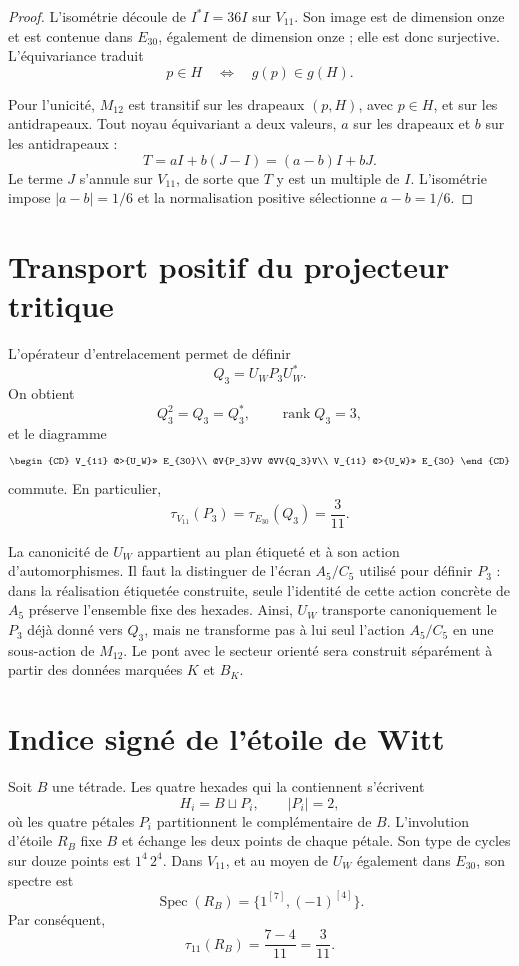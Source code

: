 \begin{proof}
L'isométrie découle de \(I^*I=36I\) sur \(V_{11}\). Son image est de
dimension onze et est contenue dans \(E_{30}\), également de dimension onze ;
elle est donc surjective. L'équivariance traduit
\[
 p\in H\quad\Longleftrightarrow\quad g(p)\in g(H).
\]

Pour l'unicité, \(M_{12}\) est transitif sur les drapeaux
\((p,H)\), avec \(p\in H\), et sur les antidrapeaux. Tout noyau
équivariant a deux valeurs, \(a\) sur les drapeaux et \(b\) sur les
antidrapeaux :
\[
 T=aI+b(J-I)=(a-b)I+bJ.
\]
Le terme \(J\) s'annule sur \(V_{11}\), de sorte que \(T\) y est un
multiple de \(I\). L'isométrie impose \(|a-b|=1/6\) et la normalisation
positive sélectionne \(a-b=1/6\).
\end{proof}

\section{Transport positif du projecteur tritique}

L'opérateur d'entrelacement permet de définir
\[
 \boxed{Q_3=U_WP_3U_W^*.}
\]
On obtient
\[
 Q_3^2=Q_3=Q_3^*,
 \qquad
 \operatorname{rank}Q_3=3,
\]
et le diagramme
\[
\begin{CD}
V_{11} @>{U_W}>> E_{30}\\
@V{P_3}VV @VV{Q_3}V\\
V_{11} @>{U_W}>> E_{30}
\end{CD}
\]
commute. En particulier,
\[
 \boxed{\tau_{V_{11}}(P_3)=\tau_{E_{30}}(Q_3)=\frac3{11}.}
\]

La canonicité de \(U_W\) appartient au plan étiqueté et à son action
d'automorphismes. Il faut la distinguer de l'écran \(A_5/C_5\) utilisé pour
définir \(P_3\) : dans la réalisation étiquetée construite, seule l'identité
de cette action concrète de \(A_5\) préserve l'ensemble fixe des hexades. Ainsi,
\(U_W\) transporte canoniquement le \(P_3\) déjà donné vers
\(Q_3\), mais ne transforme pas à lui seul l'action \(A_5/C_5\) en une
sous-action de \(M_{12}\). Le pont avec le secteur orienté sera construit séparément
à partir des données marquées \(K\) et \(B_K\).

\section{Indice signé de l'étoile de Witt}

Soit \(B\) une tétrade. Les quatre hexades qui la contiennent s'écrivent
\[
 H_i=B\sqcup P_i,\qquad |P_i|=2,
\]
où les quatre pétales \(P_i\) partitionnent le complémentaire de \(B\).
L'involution d'étoile \(R_B\) fixe \(B\) et échange les deux points
de chaque pétale. Son type de cycles sur douze points est \(1^4\,2^4\). Dans
\(V_{11}\), et au moyen de \(U_W\) également dans \(E_{30}\), son spectre est
\[
 \operatorname{Spec}(R_B)=\{1^{[7]},(-1)^{[4]}\}.
\]
Par conséquent,
\[
 \boxed{\tau_{11}(R_B)=\frac{7-4}{11}=\frac3{11}.}
\]

